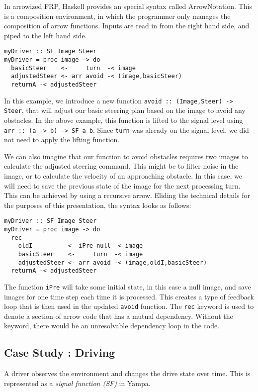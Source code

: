 In arrowized FRP, Haskell provides an special syntax called ArrowNotation.
This is a composition environment, in which the programmer only manages the composition of arrow functions.
Inputs are read in from the right hand side, and piped to the left hand side.

\begin{lstlisting}
myDriver :: SF Image Steer
myDriver = proc image -> do
  basicSteer    <-     turn  -< image
  adjustedSteer <- arr avoid -< (image,basicSteer)
  returnA -< adjustedSteer
\end{lstlisting}

In this example, we introduce a new function \texttt{avoid :: (Image,Steer) -> Steer}, that will adjust our basic steering plan based on the image to avoid any obstacles.
In the above example, this function is lifted to the signal level using \texttt{arr :: (a -> b) -> SF a b}.
Since \texttt{turn} was already on the signal level, we did not need to apply the lifting function.

We can also imagine that our function to avoid obstacles requires two images to calculate the adjusted steering command.
This might be to filter noise in the image, or to calculate the velocity of an approaching obstacle.
In this case, we will need to save the previous state of the image for the next processing turn.
This can be achieved by using a recursive arrow. 
Eliding the technical details for the purposes of this presentation, the syntax looks as follows:

\begin{lstlisting}
myDriver :: SF Image Steer
myDriver = proc image -> do
  rec
    oldI          <- iPre null -< image
    basicSteer    <-     turn  -< image
    adjustedSteer <- arr avoid -< (image,oldI,basicSteer)
  returnA -< adjustedSteer
\end{lstlisting}

The function \texttt{iPre} will take some initial state, in this case a null image, and save images for one time step each time it is processed.
This creates a type of feedback loop that is then used in the updated \texttt{avoid} function.
The \texttt{rec} keyword is used to denote a section of arrow code that has a mutual dependency.
Without the keyword, there would be an unresolvable dependency loop in the code.

\subsection{Case Study : Driving}
A driver observes the environment and changes the drive state over time.
This is represented as a \textit{signal function (SF)} in Yampa.

